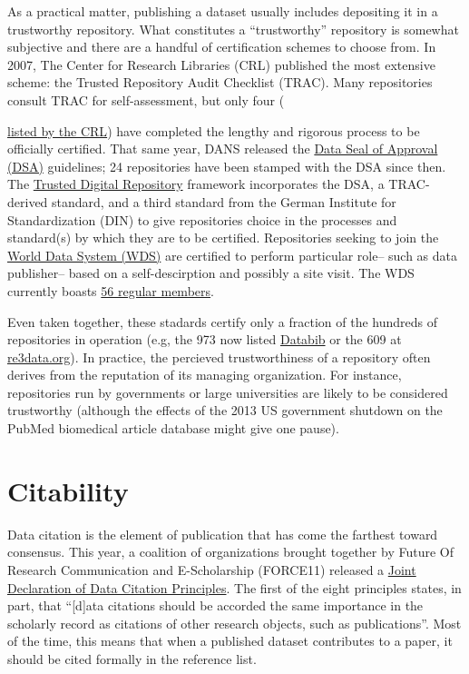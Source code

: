 \documentclass[10pt,a4paper,twocolumn]{article}
\begin{document}
As a practical matter, publishing a dataset usually includes depositing it in a trustworthy repository.
What constitutes a ``trustworthy'' repository is somewhat subjective and there are a handful of certification schemes to choose from.
In 2007, The Center for Research Libraries (CRL) published the most extensive scheme: the Trusted Repository Audit Checklist (TRAC)\cite{dale_trustworthy_2007}.
Many repositories consult TRAC for self-assessment, but only four ({\href{http://www.crl.edu/archiving-preservation/digital-archives/metrics-assessing-and-certifying-0}{listed by the CRL}) have completed the lengthy and rigorous process to be officially certified.
That same year, DANS released the \href{http://datasealofapproval.org/}{Data Seal of Approval (DSA)} guidelines; 24 repositories have been stamped with the DSA since then.
The \href{http://www.trusteddigitalrepository.eu/}{Trusted Digital Repository} framework incorporates the DSA, a TRAC-derived standard, and a third standard from the German Institute for Standardization (DIN) to give repositories choice in the processes and standard(s) by which they are to be certified.
Repositories seeking to join the \href{https://www.icsu-wds.org/}{World Data System (WDS)} are certified to perform particular role-- such as data publisher-- based on a self-descirption and possibly a site visit.
The WDS currently boasts \href{http://www.icsu-wds.org/community/membership/regular-members}{56 regular members}.

Even taken together, these stadards certify only a fraction of the hundreds of repositories in operation (e.g, the 973 now listed \href{http://databib.org/}{Databib} or the 609 at \href{http://www.re3data.org/}{re3data.org}).
In practice, the percieved trustworthiness of a repository often derives from the reputation of its managing organization.
For instance, repositories run by governments or large universities are likely to be considered trustworthy (although the effects of the 2013 US government shutdown on the PubMed biomedical article database\cite{check_hayden_nih_2013} might give one pause).


\section*{Citability}\label{citability}

Data citation is the element of publication that has come the farthest toward consensus.
This year, a coalition of organizations brought together by Future Of Research Communication and E-Scholarship (FORCE11)\cite{bourne_improving_2012} released a \href{http://www.force11.org/datacitation}{Joint Declaration of Data Citation Principles}.
The first of the eight principles states, in part, that ``[d]ata citations should be accorded the same importance in the scholarly record as citations of other research objects, such as publications''.
Most of the time, this means that when a published dataset contributes to a paper, it should be cited formally in the reference list.
	
}
\end{document}
